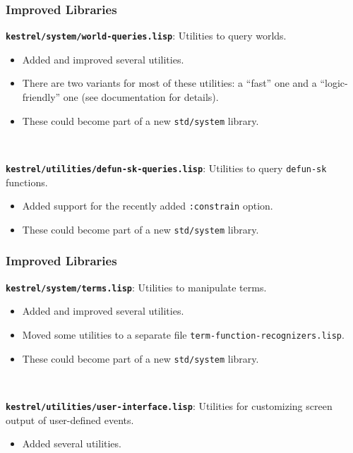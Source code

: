 \documentclass{beamer}
\newcommand{\code}[1]{\texttt{#1}}
\newcommand{\bookpath}[1]{\textbf{\code{#1}}}
\newcommand{\implibtitle}{\frametitle{Improved Libraries}}
\begin{document}
\begin{frame}

\implibtitle

\bookpath{kestrel/system/world-queries.lisp}:
Utilities to query worlds.
\begin{itemize}
\item
Added and improved several utilities.
\item
There are two variants for most of these utilities:
a ``fast'' one and a ``logic-friendly'' one
(see documentation for details).
\item
These could become part of a new \code{std/system} library.
\end{itemize}

\

\bookpath{kestrel/utilities/defun-sk-queries.lisp}:
Utilities to query \code{defun-sk} functions.
\begin{itemize}
\item
Added support for the recently added \code{:constrain} option.
\item
These could become part of a new \code{std/system} library.
\end{itemize}

\end{frame}


\begin{frame}

\implibtitle

\bookpath{kestrel/system/terms.lisp}:
Utilities to manipulate terms.
\begin{itemize}
\item
Added and improved several utilities.
\item
Moved some utilities to a separate file
\code{term-function-recognizers.lisp}.
\item
These could become part of a new \code{std/system} library.
\end{itemize}

\

\bookpath{kestrel/utilities/user-interface.lisp}:
Utilities for customizing screen output of user-defined events.
\begin{itemize}
\item
Added several utilities.
\end{itemize}

\end{frame}
\end{document}
